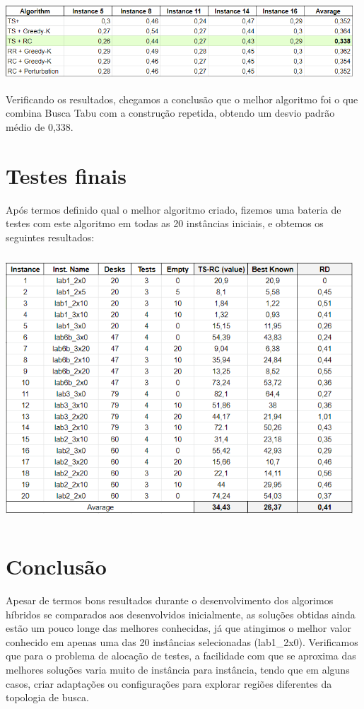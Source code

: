 \documentclass[a4paper,11pt]{article}
\begin{document}
\includegraphics[width=13cm, height=3.6cm]{tabela 2.png}
\newline
Verificando os resultados, chegamos a conclus\~ao que o melhor algoritmo foi o que combina Busca Tabu com a constru\c c\~ao repetida, obtendo um desvio padr\~ao m\'edio de 0,338.


\section{ Testes finais }

Ap\'os termos definido qual o melhor algoritmo criado, fizemos uma bateria de testes com este algoritmo em todas as 20 inst\^ancias iniciais, e obtemos os seguintes resultados:

\includegraphics[width=13cm, height=10cm]{tabela 3.png}
\section{ Conclus\~ao }
Apesar de termos bons resultados durante o desenvolvimento dos algorimos h\'ibridos se comparados aos desenvolvidos inicialmente, as solu\c c\~oes obtidas ainda est\~ao um pouco longe das melhores conhecidas, j\'a que atingimos o melhor valor conhecido em apenas uma das 20 inst\^ancias selecionadas (lab1\_2x0). Verificamos que para o problema de aloca\c c\~ao de testes, a facilidade com que se aproxima das melhores solu\c c\~oes varia muito de inst\^ancia para inst\^ancia, tendo que em alguns casos, criar adapta\c c\~oes ou configura\c c\~oes para explorar regi\~oes diferentes da topologia de busca.

~\\


\end{document}
